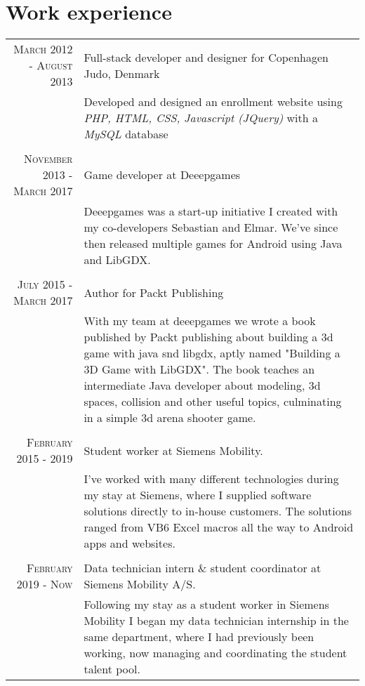 \documentclass[a4paper,10pt]{article}
\begin{document}
\section{Work experience}
\begin{tabular}{r|p{11cm}}
    \textsc{March 2012 - August 2013} & Full-stack developer and designer for Copenhagen Judo, Denmark \\&\footnotesize{Developed and designed an enrollment website using \textit{PHP, HTML, CSS, Javascript (JQuery)} with a \textit{MySQL} database}\\
    
    \multicolumn{2}{c}{} \\
    \textsc{November 2013 - March 2017} & Game developer at Deeepgames\\&\footnotesize{Deeepgames was a start-up initiative I created with my co-developers Sebastian and Elmar. We've since then released multiple games for Android using Java and LibGDX.}\\
    
    \multicolumn{2}{c}{} \\
    \textsc{July 2015 - March 2017} & Author for Packt Publishing\\&\footnotesize{With my team at deeepgames we wrote a book published by Packt publishing about building a 3d game with java snd libgdx, aptly named "Building a 3D Game with LibGDX". The book teaches an intermediate Java developer about modeling, 3d spaces, collision and other useful topics, culminating in a simple 3d arena shooter game.}\\
    
    \multicolumn{2}{c}{} \\
    \textsc{February 2015 - 2019} & Student worker at Siemens Mobility. \\ &\footnotesize{I've worked with many different technologies during my stay at Siemens, where I supplied software solutions directly to in-house customers. The solutions ranged from VB6 Excel macros all the way to Android apps and websites.}\\
    
    \multicolumn{2}{c}{} \\
    \textsc{February 2019 - Now} & Data technician intern \& student coordinator at Siemens Mobility A/S. \\ &\footnotesize{Following my stay as a student worker in Siemens Mobility I began my data technician internship in the same department, where I had previously been working, now managing and coordinating the student talent pool.}\\
\end{tabular}
\end{document}
